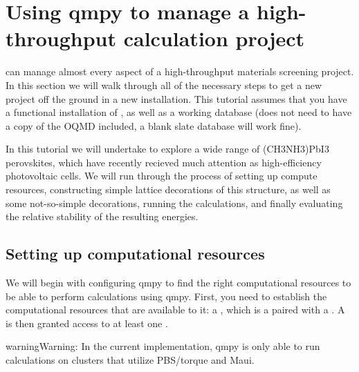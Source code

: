\documentclass[letterpaper,10pt,english]{sphinxmanual}
\begin{document}
\begin{fulllineitems}
\label{models:qmpy.utils.rendering.Axis}
\end{fulllineitems}



\chapter{Using qmpy to manage a high-throughput calculation project}
\label{project:using-qmpy-to-manage-a-high-throughput-calculation-project}\label{project::doc}
{\hyperref[models:module-qmpy]{}} can manage almost every aspect of a high-throughput materials screening
project. In this section we will walk through all of the necessary steps to
get a new project off the ground in a new installation. This tutorial assumes
that you have a functional installation of {\hyperref[models:module-qmpy]{}}, as well as a working
database (does not need to have a copy of the OQMD included, a blank slate
database will work fine).

In this tutorial we will undertake to explore a wide range of (CH3NH3)PbI3
perovskites, which have recently recieved much attention as high-efficiency
photovoltaic cells. We will run through the process of setting up compute
resources, constructing simple lattice decorations of this structure, as well
as some not-so-simple decorations, running the calculations, and finally
evaluating the relative stability of the resulting energies.


\section{Setting up computational resources}
\label{project:setting-up-computational-resources}
We will begin with configuring qmpy to find the right computational resources
to be able to perform calculations using qmpy. First, you need to establish the
computational resources that are available to it: a {\hyperref[models:qmpy.Account]{}}, which is a
{\hyperref[models:qmpy.Host]{}} paired with a {\hyperref[models:qmpy.User]{}}. A {\hyperref[models:qmpy.Account]{}} is then granted
access to at least one {\hyperref[models:qmpy.Allocation]{}}.

\begin{notice}{warning}{Warning:}
In the current implementation, qmpy is only able to run calculations on
clusters that utilize PBS/torque and Maui.
\end{notice}
\end{document}
